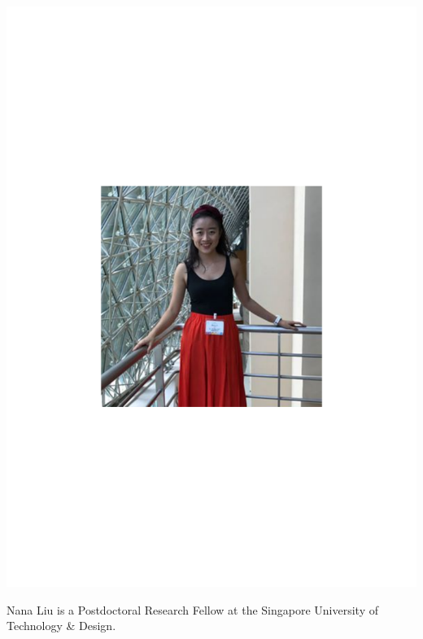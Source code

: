 \documentclass[aps,prl,twocolumn,amsmath,amssymb,nofootinbib,superscriptaddress]{revtex4}
\begin{document}
\includegraphics[width=\columnwidth]{photo_nana_liu}

Nana Liu is a Postdoctoral Research Fellow at the Singapore University of Technology \& Design.
\end{document}
